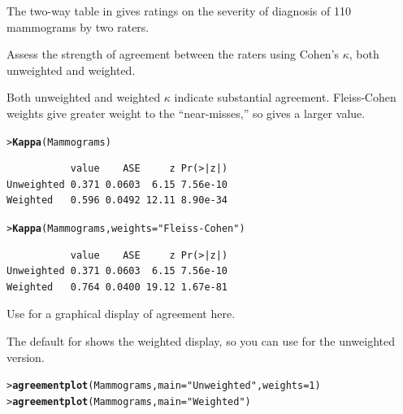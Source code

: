 \documentclass[10pt]{report}\usepackage[]{graphicx}\usepackage[]{color}
\makeatletter
\newcommand{\hlnum}[1]{\textcolor[rgb]{0.686,0.059,0.569}{#1}}%
\newcommand{\hlstr}[1]{\textcolor[rgb]{0.192,0.494,0.8}{#1}}%
\newcommand{\hlstd}[1]{\textcolor[rgb]{0.345,0.345,0.345}{#1}}%
\newcommand{\hlkwc}[1]{\textcolor[rgb]{0.333,0.667,0.333}{#1}}%
\newcommand{\hlkwd}[1]{\textcolor[rgb]{0.737,0.353,0.396}{\textbf{#1}}}%
\newenvironment{kframe}{%
 \def\at@end@of@kframe{}%
 \ifinner\ifhmode%
  \def\at@end@of@kframe{\end{minipage}}%
  \begin{minipage}{\columnwidth}%
 \fi\fi%
 \def\FrameCommand##1{\hskip\@totalleftmargin \hskip-\fboxsep
 \colorbox{shadecolor}{##1}\hskip-\fboxsep
     \hskip-\linewidth \hskip-\@totalleftmargin \hskip\columnwidth}%
 \MakeFramed {\advance\hsize-\width
   \@totalleftmargin\z@ \linewidth\hsize
   \@setminipage}}%
 {\par\unskip\endMakeFramed%
 \at@end@of@kframe}
\newenvironment{knitrout}{}{} %
\renewenvironment{knitrout}{\small\renewcommand{\baselinestretch}{.85}}{} %
\makeatother
\begin{document}
\begin{Exercises}
  \exercise The two-way table  in  gives ratings
  on the severity of diagnosis of 110 mammograms by two raters.
    \begin{enumerate*}
      \item Assess the strength of agreement between the raters using Cohen's
      $\kappa$, both unweighted and weighted.
      \begin{ans}
      Both unweighted and weighted $\kappa$ indicate substantial agreement.
      Fleiss-Cohen weights give greater weight to the ``near-misses,'' so gives
      a larger value.
\begin{knitrout}\footnotesize
{}\color{fgcolor}\begin{kframe}
\begin{alltt}
\hlstd{> }\hlkwd{Kappa}\hlstd{(Mammograms)}
\end{alltt}
\begin{verbatim}
           value    ASE     z Pr(>|z|)
Unweighted 0.371 0.0603  6.15 7.56e-10
Weighted   0.596 0.0492 12.11 8.90e-34
\end{verbatim}
\begin{alltt}
\hlstd{> }\hlkwd{Kappa}\hlstd{(Mammograms,} \hlkwc{weights}\hlstd{=} \hlstr{"Fleiss-Cohen"}\hlstd{)}
\end{alltt}
\begin{verbatim}
           value    ASE     z Pr(>|z|)
Unweighted 0.371 0.0603  6.15 7.56e-10
Weighted   0.764 0.0400 19.12 1.67e-81
\end{verbatim}
\end{kframe}
\end{knitrout}

      \end{ans}
      
      \item Use  for a graphical display of agreement here.
      \begin{ans}
      The default for  shows the weighted display, so you can use 
      for the unweighted version.
\begin{knitrout}\footnotesize
{}\color{fgcolor}\begin{kframe}
\begin{alltt}
\hlstd{> }\hlkwd{agreementplot}\hlstd{(Mammograms,} \hlkwc{main}\hlstd{=}\hlstr{"Unweighted"}\hlstd{,} \hlkwc{weights}\hlstd{=}\hlnum{1}\hlstd{)}
\hlstd{> }\hlkwd{agreementplot}\hlstd{(Mammograms,} \hlkwc{main}\hlstd{=}\hlstr{"Weighted"}\hlstd{)}
\end{alltt}
\end{kframe}


\end{knitrout}
\end{ans}
\end{enumerate*}
\end{Exercises}
\end{document}
